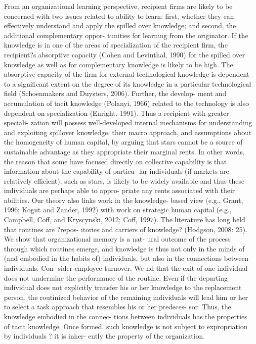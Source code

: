 \documentclass[12pt,letterpaper]{article}
\begin{document}
From an organizational learning perspective, recipient firms are likely to be concerned with two issues related to ability to learn: first, whether they can effectively understand and apply the spilled over knowledge; and second, the additional complementary oppor- tunities for learning from the originator. If the knowledge is in one of the areas of specialization of the recipient firm, the recipient?s absorptive capacity (Cohen and Levinthal, 1990) for the spilled over knowledge as well as for complementary knowledge is likely to be high. The absorptive capacity of the firm for external technological knowledge is dependent to a significant extent on the degree of its knowledge in a particular technological field (Schoenmakers and Duysters, 2006). Further, the develop- ment and accumulation of tacit knowledge (Polanyi, 1966) related to the technology is also dependent on specialization (Enright, 1991). Thus a recipient with greater speciali- zation will possess well-developed internal mechanisms for understanding and exploiting spillover knowledge.
 their macro approach, and assumptions about the homogeneity of human capital, by arguing that stars cannot be a source of sustainable advantage as they appropriate their marginal rents. In other words, the reason that some have focused directly on collective capability is that information about the capability of particu- lar individuals (if markets are relatively efficient), such as stars, is likely to be widely available and thus these individuals are perhaps able to appro- priate any rents associated with their abilities.
Our theory also links work in the knowledge- based view (e.g., Grant, 1996; Kogut and Zander, 1992) with work on strategic human capital (e.g., Campbell, Coff, and Kryscynski, 2012; Coff, 1997). The literature has long held that routines are ?repos- itories and carriers of knowledge? (Hodgson, 2008: 25). We show that organizational memory is a nat- ural outcome of the process through which routines emerge, and knowledge is thus not only in the minds of (and embodied in the habits of) individuals, but also in the connections between individuals. Con- sider employee turnover. We  nd that the exit of one individual does not undermine the performance of the routine. Even if the departing individual does not explicitly transfer his or her knowledge to the replacement person, the routinized behavior of the remaining individuals will lead him or her to select a task approach that resembles his or her predeces- sor. Thus, the knowledge embodied in the connec- tions between individuals has the properties of tacit knowledge. Once formed, such knowledge is not subject to expropriation by individuals ? it is inher- ently the property of the organization.
\end{document}
